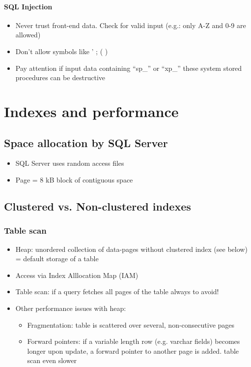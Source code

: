 \documentclass{report}
\begin{document}
    \subsubsection{SQL Injection}
        \begin{itemize} 
            \item Never trust front-end data. Check for valid input (e.g.: only A-Z and 0-9 are allowed)
            \item Don't allow symbols like ' ; ( ) \textendash
            \item Pay attention if input data containing ``sp\_'' or ``xp\_'' \textrightarrow these system stored procedures can be destructive
        \end{itemize}
    
{\let\clearpage\relax \chapter{Indexes and performance}}

    \section{Space allocation by SQL Server}
    \begin{itemize} 
        \item SQL Server uses random access files
        \item Page = 8 kB block of contiguous space
    \end{itemize}
    \section{Clustered vs. Non-clustered indexes}
    \subsection{Table scan}
    \begin{itemize} 
        \item Heap: unordered collection of data-pages without clustered index (see below) = default storage of a table
        \item Access via Index Alllocation Map (IAM)
        \item Table scan: if a query fetches all pages of the table \textrightarrow always to avoid!
        \item Other performance issues with heap:
            \begin{itemize} 
                \item Fragmentation: table is scattered over several, non-consecutive pages
                \item Forward pointers: if a variable length row (e.g. varchar fields) becomes longer upon update, a forward pointer to another page is added. \textrightarrow table scan even slower
            \end{itemize}
    \end{itemize}
\end{document}
